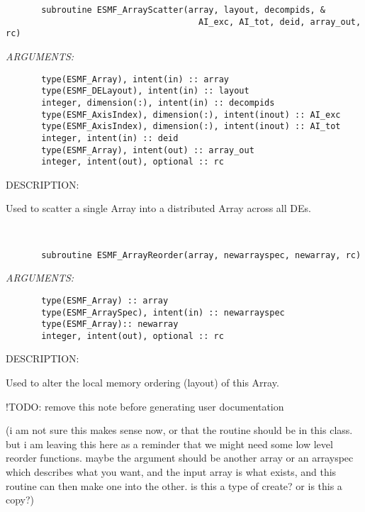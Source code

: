 \begin{verbatim}       subroutine ESMF_ArrayScatter(array, layout, decompids, &
                                      AI_exc, AI_tot, deid, array_out, rc)\end{verbatim}{\em ARGUMENTS:}
\begin{verbatim}       type(ESMF_Array), intent(in) :: array
       type(ESMF_DELayout), intent(in) :: layout
       integer, dimension(:), intent(in) :: decompids
       type(ESMF_AxisIndex), dimension(:), intent(inout) :: AI_exc
       type(ESMF_AxisIndex), dimension(:), intent(inout) :: AI_tot
       integer, intent(in) :: deid
       type(ESMF_Array), intent(out) :: array_out
       integer, intent(out), optional :: rc\end{verbatim}
{\sf DESCRIPTION:\\ }


   Used to scatter a single Array into a distributed Array across all DEs.
  
   
 
\mbox{}\hrulefill\ 
 

\begin{verbatim}       subroutine ESMF_ArrayReorder(array, newarrayspec, newarray, rc)\end{verbatim}{\em ARGUMENTS:}
\begin{verbatim}       type(ESMF_Array) :: array
       type(ESMF_ArraySpec), intent(in) :: newarrayspec
       type(ESMF_Array):: newarray
       integer, intent(out), optional :: rc\end{verbatim}
{\sf DESCRIPTION:\\ }


   Used to alter the local memory ordering (layout) of this Array.
  
   !TODO: remove this note before generating user documentation
  
   (i am not sure this makes sense now, or that the routine should be
   in this class. but i am leaving this here as a reminder that we
   might need some low level reorder functions. maybe the argument
   should be another array or an arrayspec which describes what you
   want, and the input array is what exists, and this routine can then
   make one into the other. is this a type of create? or is this
   a copy?)
   
 
\mbox{}\hrulefill\ 
 

